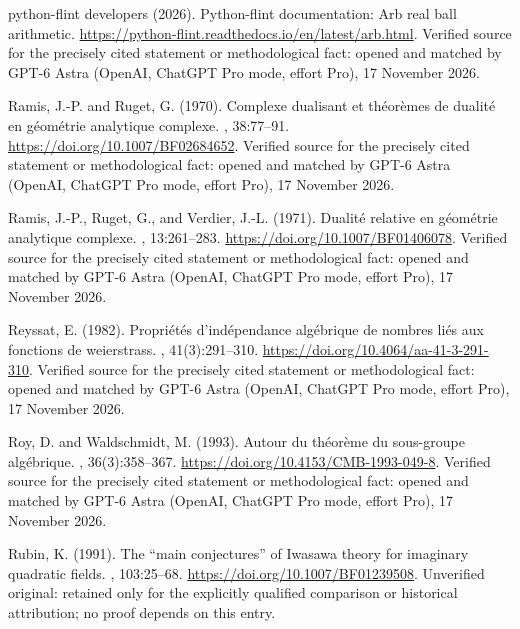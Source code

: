 \begin{thebibliography}{}
{python-flint developers} (2026).
\newblock Python-flint documentation: Arb real ball arithmetic.
\newblock \url{https://python-flint.readthedocs.io/en/latest/arb.html}. Verified source for the precisely cited statement or methodological fact: opened and matched by GPT-6 Astra (OpenAI, ChatGPT Pro mode, effort Pro), 17 November 2026.

Ramis, J.-P. and Ruget, G. (1970).
\newblock Complexe dualisant et th{\'e}or{\`e}mes de dualit{\'e} en
  g{\'e}om{\'e}trie analytique complexe.
, 38:77--91.
\newblock \url{https://doi.org/10.1007/BF02684652}. Verified source for the precisely cited statement or methodological fact: opened and matched by GPT-6 Astra (OpenAI, ChatGPT Pro mode, effort Pro), 17 November 2026.

Ramis, J.-P., Ruget, G., and Verdier, J.-L. (1971).
\newblock Dualit{\'e} relative en g{\'e}om{\'e}trie analytique complexe.
, 13:261--283.
\newblock \url{https://doi.org/10.1007/BF01406078}. Verified source for the precisely cited statement or methodological fact: opened and matched by GPT-6 Astra (OpenAI, ChatGPT Pro mode, effort Pro), 17 November 2026.

Reyssat, E. (1982).
\newblock Propri\'et\'es d'ind\'ependance alg\'ebrique de nombres li\'es aux
  fonctions de weierstrass.
, 41(3):291--310.
\newblock \url{https://doi.org/10.4064/aa-41-3-291-310}. Verified source for the precisely cited statement or methodological fact: opened and matched by GPT-6 Astra (OpenAI, ChatGPT Pro mode, effort Pro), 17 November 2026.

Roy, D. and Waldschmidt, M. (1993).
\newblock Autour du th\'eor\`eme du sous-groupe alg\'ebrique.
, 36(3):358--367.
\newblock \url{https://doi.org/10.4153/CMB-1993-049-8}. Verified source for the precisely cited statement or methodological fact: opened and matched by GPT-6 Astra (OpenAI, ChatGPT Pro mode, effort Pro), 17 November 2026.

Rubin, K. (1991).
\newblock The ``main conjectures'' of {I}wasawa theory for imaginary quadratic
  fields.
, 103:25--68.
\newblock \url{https://doi.org/10.1007/BF01239508}. Unverified original: retained only for the explicitly qualified comparison or historical attribution; no proof depends on this entry.


\end{thebibliography}
